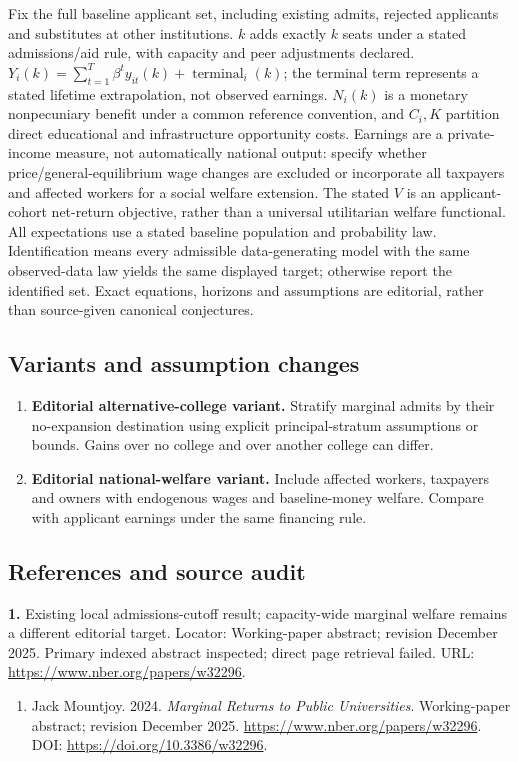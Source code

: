 \documentclass[11pt,a4paper]{article}
\begin{document}
Fix the full baseline applicant set, including existing admits, rejected applicants and substitutes at other institutions. \(k\) adds exactly \(k\) seats under a stated admissions/aid rule, with capacity and peer adjustments declared. \(Y_i(k)=\sum_{t=1}^{T}\beta^ty_{it}(k)+\operatorname{terminal}_i(k)\); the terminal term represents a stated lifetime extrapolation, not observed earnings. \(N_i(k)\) is a monetary nonpecuniary benefit under a common reference convention, and \(C_i,K\) partition direct educational and infrastructure opportunity costs. Earnings are a private-income measure, not automatically national output: specify whether price/general-equilibrium wage changes are excluded or incorporate all taxpayers and affected workers for a social welfare extension. The stated \(V\) is an applicant-cohort net-return objective, rather than a universal utilitarian welfare functional. All expectations use a stated baseline population and probability law. Identification means every admissible data-generating model with the same observed-data law yields the same displayed target; otherwise report the identified set. Exact equations, horizons and assumptions are editorial, rather than source-given canonical conjectures.
\subsection*{Variants and assumption changes}
\begin{enumerate}
\item \textbf{Editorial alternative-college variant.} Stratify marginal admits by their no-expansion destination using explicit principal-stratum assumptions or bounds. Gains over no college and over another college can differ.
\item \textbf{Editorial national-welfare variant.} Include affected workers, taxpayers and owners with endogenous wages and baseline-money welfare. Compare with applicant earnings under the same financing rule.
\end{enumerate}
\subsection*{References and source audit}
\textbf{1.} Existing local admissions-cutoff result; capacity-wide marginal welfare remains a different editorial target. Locator: Working-paper abstract; revision December 2025. Primary indexed abstract inspected; direct page retrieval failed. URL: \url{https://www.nber.org/papers/w32296}.
\begin{enumerate}\raggedright
\item\hypertarget{definitions:source:30007736:1}{} Jack Mountjoy. 2024. \emph{Marginal Returns to Public Universities}. Working-paper abstract; revision December 2025.
\url{https://www.nber.org/papers/w32296}.
DOI: \url{https://doi.org/10.3386/w32296}.
\end{enumerate}
\end{document}
